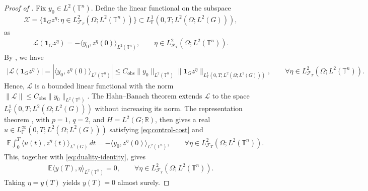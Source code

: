 \documentclass[print,wide]{draft}
\begin{document}
\begin{proof}[Proof of ]
Fix $y_0\in L^2(\mathbb T^n)$.  Define the linear functional on the subspace
\begin{align*}
\mathcal X
=\{\mathbf{1}_G z^\eta:\eta\in L^2_{\mathcal F_T}(\Omega;L^2(\mathbb T^n))\}
\subset L^1_{\mathbb F}(0,T;L^2(\Omega;L^2(G))),
\end{align*}
as
\begin{align*}
\mathcal L(\mathbf{1}_G z^\eta)=-\langle y_0,z^\eta(0)\rangle_{L^2(\mathbb T^n)},\qquad \eta\in L^2_{\mathcal F_T}(\Omega;L^2(\mathbb T^n)).
\end{align*}
By , we have
%
\begin{align*}
|\mathcal L(\mathbf{1}_G z^\eta)| = |\langle y_0,z^\eta(0)\rangle_{L^2(\mathbb T^n)}| \leq C_{\mathrm{obs}}\|y_0\|_{L^2(\mathbb T^n)} \|\mathbf{1}_G z^\eta \|_{L^1_{\mathbb F}(0,T;L^2(\Omega;L^2(G)))}, \qquad \forall\eta\in L^2_{\mathcal F_T}(\Omega;L^2(\mathbb T^n)).
\end{align*}
%
Hence,
$\mathcal L$ is a bounded linear functional with the norm
$\|\mathcal L\|\leq C_{\mathrm{obs}}\|y_0\|_{L^2(\mathbb T^n)}$.
The Hahn--Banach theorem extends $\mathcal L$ to the  
space $L^1_{\mathbb F}(0,T;L^2(\Omega;L^2(G)))$ without increasing its norm.  The representation theorem
\cite[Theorem~2.73]{Lue2021a}, with $p=1$, $q=2$, and $H=L^2(G;\mathbb R)$,
then gives a real
$u\in L^\infty_{\mathbb F}(0,T;L^2(\Omega;L^2(G)))$
satisfying \eqref{eq:control-cost} and
\begin{align*}
\mathbb E\int_0^T\langle u(t),z^\eta(t)\rangle_{L^2(G)}\,dt
=-\langle y_0,z^\eta(0)\rangle_{L^2(\mathbb T^n)},
\qquad\forall\eta\in L^2_{\mathcal F_T}(\Omega;L^2(\mathbb T^n)).
\end{align*}
This, together with \eqref{eq:duality-identity}, gives
\begin{align*}
	\mathbb E\langle y(T),\eta\rangle_{L^2(\mathbb T^n)}=0,
\qquad\forall\eta\in L^2_{\mathcal F_T}(\Omega;L^2(\mathbb T^n)).
\end{align*}
%
Taking $\eta=y(T)$ yields $y(T)=0$ almost surely.
\end{proof}
\end{document}

